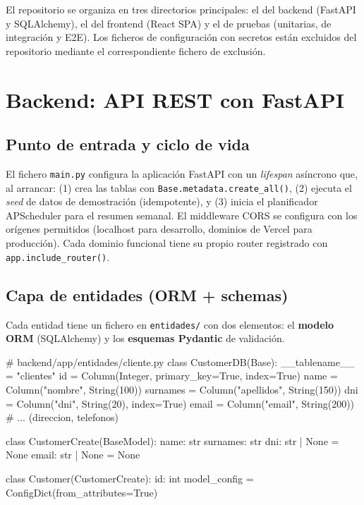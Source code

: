 \documentclass[12pt,twoside,titlepage]{report}
\begin{document}
El repositorio se organiza en tres directorios principales: el del backend (FastAPI y SQLAlchemy), el del frontend (React SPA) y el de pruebas (unitarias, de integración y E2E). Los ficheros de configuración con secretos están excluidos del repositorio mediante el correspondiente fichero de exclusión.

\section{Backend: API REST con FastAPI}

\subsection{Punto de entrada y ciclo de vida}

El fichero \texttt{main.py} configura la aplicación FastAPI con un \emph{lifespan} asíncrono que, al arrancar: (1) crea las tablas con \texttt{Base.metadata.create\_all()}, (2) ejecuta el \emph{seed} de datos de demostración (idempotente), y (3) inicia el planificador APScheduler para el resumen semanal. El middleware CORS se configura con los orígenes permitidos (localhost para desarrollo, dominios de Vercel para producción). Cada dominio funcional tiene su propio router registrado con \texttt{app.include\_router()}.

\subsection{Capa de entidades (ORM + schemas)}

Cada entidad tiene un fichero en \texttt{entidades/} con dos elementos: el \textbf{modelo ORM} (SQLAlchemy) y los \textbf{esquemas Pydantic} de validación.

\begin{mypython}[caption={Ejemplo: modelo ORM y schema Pydantic de un cliente.},label={code:cliente}]
# backend/app/entidades/cliente.py
class CustomerDB(Base):
    __tablename__ = "clientes"
    id       = Column(Integer, primary_key=True, index=True)
    name     = Column("nombre", String(100))
    surnames = Column("apellidos", String(150))
    dni      = Column("dni", String(20), index=True)
    email    = Column("email", String(200))
    # ... (direccion, telefonos)

class CustomerCreate(BaseModel):
    name: str
    surnames: str
    dni: str | None = None
    email: str | None = None

class Customer(CustomerCreate):
    id: int
    model_config = ConfigDict(from_attributes=True)
\end{mypython}
\end{document}
